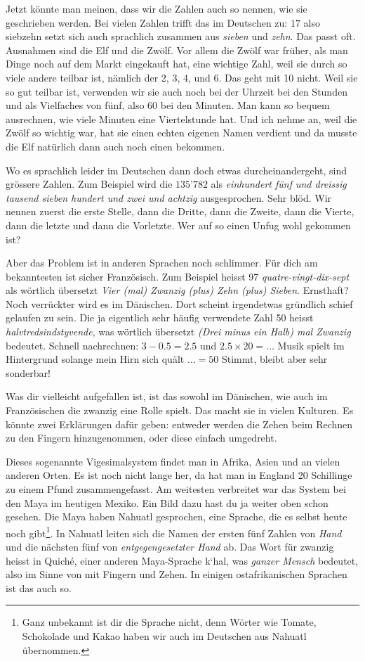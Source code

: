 Jetzt könnte man meinen, dass wir die Zahlen auch so nennen, wie sie geschrieben werden. Bei vielen Zahlen trifft das im Deutschen zu: $17$ also siebzehn setzt sich auch sprachlich zusammen aus \textit{sieben} und \textit{zehn}. Das passt oft. Ausnahmen sind die Elf und die Zwölf. Vor allem die Zwölf war früher, als man Dinge noch auf dem Markt eingekauft hat, eine wichtige Zahl, weil sie durch so viele andere teilbar ist, nämlich der 2, 3, 4, und 6. Das geht mit 10 nicht. Weil sie so gut teilbar ist, verwenden wir sie auch noch bei der Uhrzeit bei den Stunden und als Vielfaches von fünf, also 60 bei den Minuten. Man kann so bequem ausrechnen, wie viele Minuten eine Viertelstunde hat. Und ich nehme an, weil die Zwölf so wichtig war, hat sie einen echten eigenen Namen verdient und da musste die Elf natürlich dann auch noch einen bekommen.

Wo es sprachlich leider im Deutschen dann doch etwas durcheinandergeht, sind grössere Zahlen. Zum Beispiel wird die $135’782$ als \textit{einhundert fünf und dreissig tausend sieben hundert und zwei und achtzig} ausgesprochen. Sehr blöd. Wir nennen zuerst die erste Stelle, dann die Dritte, dann die Zweite, dann die Vierte, dann die letzte und dann die Vorletzte. Wer auf so einen Unfug wohl gekommen ist?

Aber das Problem ist in anderen Sprachen noch schlimmer. Für dich am bekanntesten ist sicher Französisch. Zum Beispiel heisst 97 \textit{quatre-vingt-dix-sept} als wörtlich übersetzt \textit{Vier (mal) Zwanzig (plus) Zehn (plus) Sieben}. Ernsthaft? Noch verrückter wird es im Dänischen. Dort scheint irgendetwas gründlich schief gelaufen zu sein. Die ja eigentlich sehr häufig verwendete Zahl 50 heisst \textit{halvtredsindstyvende}, was wörtlich übersetzt \textit{(Drei minus ein Halb) mal Zwanzig} bedeutet. Schnell nachrechnen: $3-0.5=2.5$ und $2.5\times20=\dots$ Musik spielt im Hintergrund solange mein Hirn sich quält $\dots = 50$ Stimmt, bleibt aber sehr sonderbar!

Was dir vielleicht aufgefallen ist, ist das sowohl im Dänischen, wie auch im Französischen die zwanzig eine Rolle spielt. Das macht sie in vielen Kulturen. Es könnte zwei Erklärungen dafür geben: entweder werden die Zehen beim Rechnen zu den Fingern hinzugenommen, oder diese einfach umgedreht.

Dieses sogenannte Vigesimalsystem findet man in Afrika, Asien und an vielen anderen Orten. Es ist noch nicht lange her, da hat man in England 20 Schillinge zu einem Pfund zusammengefasst. Am weitesten verbreitet war das System bei den Maya im heutigen Mexiko. Ein Bild dazu hast du ja weiter oben schon gesehen. Die Maya haben Nahuatl gesprochen, eine Sprache, die es selbst heute noch gibt\footnote{Ganz unbekannt ist dir die Sprache nicht, denn Wörter wie Tomate, Schokolade und Kakao haben wir auch im Deutschen aus Nahuatl übernommen.}. In Nahuatl leiten sich die Namen der ersten fünf Zahlen von \textit{Hand} und die nächsten fünf von \textit{entgegengesetzter Hand} ab. Das Wort für zwanzig heisst in Quiché, einer anderen Maya-Sprache k‘hal, was \textit{ganzer Mensch} bedeutet, also im Sinne von mit Fingern und Zehen. In einigen ostafrikanischen Sprachen ist das auch so.


